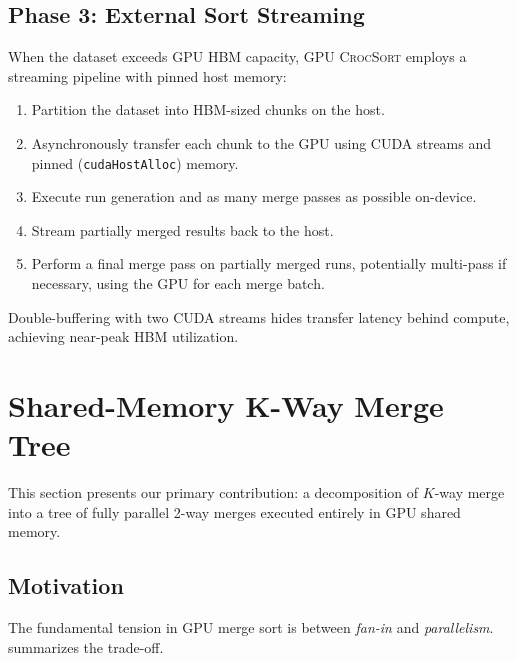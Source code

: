 \documentclass[conference,10pt]{IEEEtran}
\newcommand{\gpucrocsort}{\textsc{GPU CrocSort}\xspace}
\begin{document}
\subsection{Phase 3: External Sort Streaming}
\label{sec:external}

When the dataset exceeds GPU HBM capacity, \gpucrocsort employs a streaming
pipeline with pinned host memory:

\begin{enumerate}[leftmargin=*,topsep=2pt,itemsep=1pt]
  \item Partition the dataset into HBM-sized chunks on the host.
  \item Asynchronously transfer each chunk to the GPU using CUDA streams
    and pinned (\texttt{cudaHostAlloc}) memory.
  \item Execute run generation and as many merge passes as possible
    on-device.
  \item Stream partially merged results back to the host.
  \item Perform a final merge pass on partially merged runs, potentially
    multi-pass if necessary, using the GPU for each merge batch.
\end{enumerate}

Double-buffering with two CUDA streams hides transfer latency behind
compute, achieving near-peak HBM utilization.


\section{Shared-Memory K-Way Merge Tree}
\label{sec:kway}

This section presents our primary contribution: a decomposition of $K$-way
merge into a tree of fully parallel 2-way merges executed entirely in GPU
shared memory.

\subsection{Motivation}

The fundamental tension in GPU merge sort is between \emph{fan-in} and
\emph{parallelism}.   summarizes the trade-off.
\end{document}
